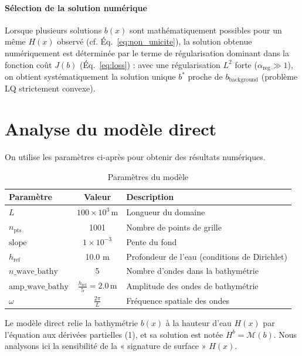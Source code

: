 \documentclass{article}
\begin{document}
\paragraph{Sélection de la solution numérique} 
Lorsque plusieurs solutions $b(x)$ sont mathématiquement possibles pour un même $H(x)$ observé (cf. Éq.~\ref{eq:non_unicite}), la solution obtenue numériquement est déterminée par le terme de régularisation dominant dans la fonction coût $J(b)$ (Éq.~\ref{eq:loss}) : avec une régularisation $L^2$ forte ($\alpha_{\text{reg}} \gg 1$), on obtient systématiquement la solution unique $b^*$ proche de $b_{\text{background}}$ (problème LQ strictement convexe).




\section{Analyse du modèle direct}

On utilise les paramètres ci-après pour obtenir des résultats numériques.

\begin{table}[H]
\centering
\begin{tabular}{|l|c|l|}
\hline
\textbf{Paramètre} & \textbf{Valeur} & \textbf{Description} \\
\hline
\( L \) & \( 100 \times 10^3 \, \text{m} \) & Longueur du domaine \\
\( n_{\text{pts}} \) & 1001 & Nombre de points de grille \\
\( \text{slope} \) & \( 1 \times 10^{-3} \) & Pente du fond \\
\( h_{\text{ref}} \) & 10.0 m & Profondeur de l'eau (conditions de Dirichlet) \\
\( n\_{\text{wave\_bathy}} \) & 5 & Nombre d'ondes dans la bathymétrie \\
\( \text{amp}\_{\text{wave\_bathy}} \) & \( \frac{h_{\text{ref}}}{5} = 2.0 \, \text{m} \) & Amplitude des ondes de bathymétrie \\
\( \omega \) & \( \frac{2\pi}{L} \) & Fréquence spatiale des ondes \\
\hline
\end{tabular}
\caption{Paramètres du modèle}
\label{tab:parametres}
\end{table}


Le modèle direct relie la bathymétrie $b(x)$ à la hauteur d'eau $H(x)$ par l'équation aux dérivées partielles (1), et sa solution est notée $H^b = \mathcal{M}(b)$. Nous analysons ici la sensibilité de la « signature de surface » $H(x)$.
\end{document}
